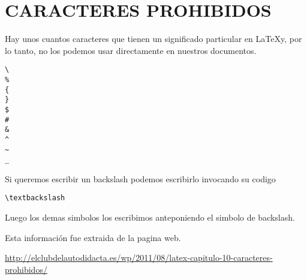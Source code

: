 \section{CARACTERES PROHIBIDOS}

Hay unos cuantos caracteres que tienen un
significado particular en \LaTeX\quad y, por lo tanto,
no los podemos usar directamente en nuestros documentos.

\begin{verbatim}
\
%
{
}
$
#
&
^
~
_
\end{verbatim}

Si queremos escribir un backslash podemos escribirlo invocando su codigo

\begin{verbatim}
\textbackslash
\end{verbatim}

Luego los demas simbolos los escribimos anteponiendo el simbolo de backslash.

Esta información fue extraida de la pagina web.

\url{http://elclubdelautodidacta.es/wp/2011/08/latex-capitulo-10-caracteres-prohibidos/}
